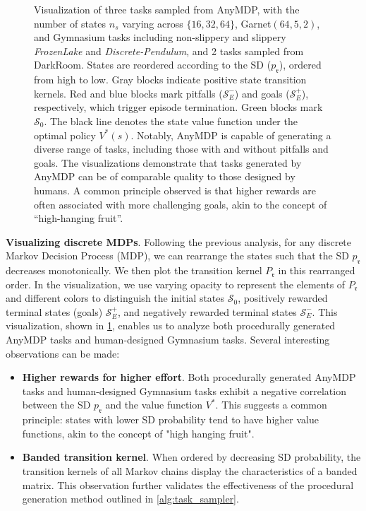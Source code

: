 \documentclass{article}
\begin{document}
\begin{figure}[!htbp]
\caption{Visualization of three tasks sampled from AnyMDP, with the number of states $n_s$ varying across $\{16, 32, 64\}$, Garnet$(64,5,2)$, and Gymnasium tasks including non-slippery and slippery \emph{FrozenLake} and \emph{Discrete-Pendulum}, and 2 tasks sampled from DarkRoom. States are reordered according to the SD ($p_{\mathfrak{r}}$), ordered from high to low. Gray blocks indicate positive state transition kernels. Red and blue blocks mark pitfalls ($\mathcal{S}^-_E$) and goals ($\mathcal{S}^+_E$), respectively, which trigger episode termination. Green blocks mark $\mathcal{S}_0$. The black line denotes the state value function under the optimal policy $V^*(s)$. Notably, AnyMDP is capable of generating a diverse range of tasks, including those with and without pitfalls and goals. The visualizations demonstrate that tasks generated by AnyMDP can be of comparable quality to those designed by humans. A common principle observed is that higher rewards are often associated with more challenging goals, akin to the concept of ``high-hanging fruit''.}
\label{fig:anymdp_visualization}
\end{figure}

\textbf{Visualizing discrete MDPs}. Following the previous analysis, for any discrete Markov Decision Process (MDP), we can rearrange the states such that the SD $p_{\mathfrak{r}}$ decreases monotonically. We then plot the transition kernel $P_{\mathfrak{r}}$ in this rearranged order. In the visualization, we use varying opacity to represent the elements of $P_{\mathfrak{r}}$ and different colors to distinguish the initial states $\mathcal{S}_0$, positively rewarded terminal states (goals) $\mathcal{S}^+_E$, and negatively rewarded terminal states $\mathcal{S}^-_E$. This visualization, shown in \cref{fig:anymdp_visualization}, enables us to analyze both procedurally generated AnyMDP tasks and human-designed Gymnasium tasks. Several interesting observations can be made:
\begin{itemize}
    \item \textbf{Higher rewards for higher effort}. Both procedurally generated AnyMDP tasks and human-designed Gymnasium tasks exhibit a negative correlation between the SD $p_{\mathfrak{r}}$ and the value function $V^{*}$. This suggests a common principle: states with lower SD probability tend to have higher value functions, akin to the concept of "high hanging fruit".
    \item \textbf{Banded transition kernel}. When ordered by decreasing SD probability, the transition kernels of all Markov chains display the characteristics of a banded matrix. This observation further validates the effectiveness of the procedural generation method outlined in \cref{alg:task_sampler}.
\end{itemize}
\end{document}
